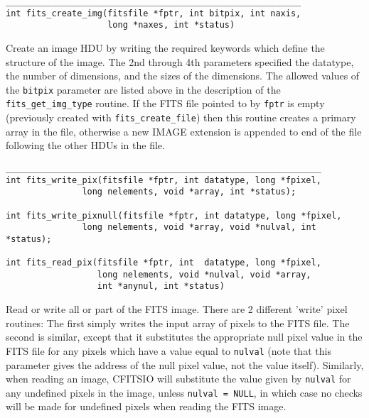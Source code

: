 \documentclass[11pt]{article}
\begin{document}
\begin{verbatim}
__________________________________________________________
int fits_create_img(fitsfile *fptr, int bitpix, int naxis, 
                    long *naxes, int *status)
\end{verbatim}

Create an image HDU by writing the required keywords which define the
structure of the image.  The 2nd through 4th parameters  specified the
datatype, the number of dimensions, and the sizes of the dimensions.
The allowed values of the {\tt bitpix} parameter are listed above in
the description of the {\tt fits\_get\_img\_type} routine.  If the FITS
file pointed to by {\tt fptr} is empty (previously created with
{\tt fits\_create\_file}) then this routine creates a primary array in
the file, otherwise a new IMAGE extension is appended to end of the
file following the other HDUs in the file.

\begin{verbatim}
______________________________________________________________
int fits_write_pix(fitsfile *fptr, int datatype, long *fpixel,
               long nelements, void *array, int *status);

int fits_write_pixnull(fitsfile *fptr, int datatype, long *fpixel,
               long nelements, void *array, void *nulval, int *status);

int fits_read_pix(fitsfile *fptr, int  datatype, long *fpixel, 
                  long nelements, void *nulval, void *array, 
                  int *anynul, int *status)
\end{verbatim}

Read or write all or part of the FITS image.  There are 2 different
'write' pixel routines:  The first simply writes the input array of pixels
to the FITS file.  The second is similar, except that it substitutes
the appropriate null pixel value in the FITS file for any pixels 
which have a value equal to {\tt *nulval} (note that this parameter
gives the address of the null pixel value, not the value itself).
Similarly,  when reading an image, CFITSIO will substitute the value
given by {\tt nulval}  for  any undefined pixels in the image, unless
{\tt nulval = NULL}, in which case no checks will be made for undefined
pixels when reading the FITS image.
\end{document}
